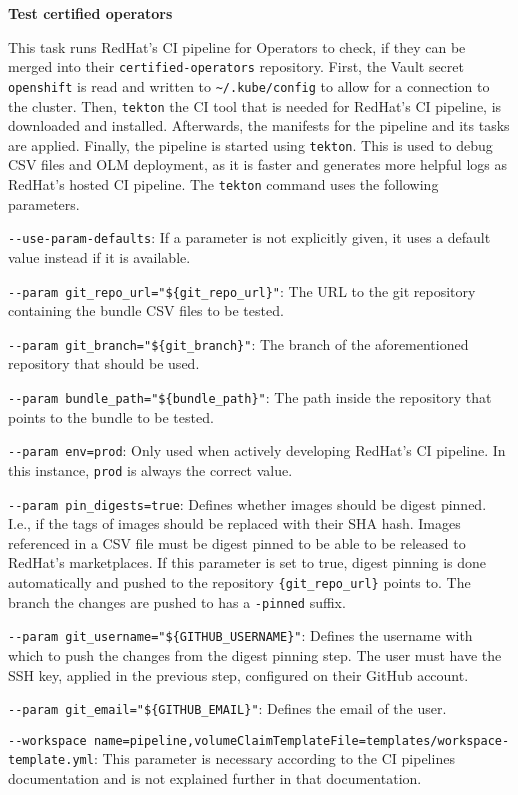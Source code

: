 \textbf{Test certified operators}

This task runs RedHat's CI pipeline for Operators to check, if they can be merged into their \verb|certified-operators| repository.
First, the Vault secret \verb|openshift| is read and written to \verb|~/.kube/config| to allow for a connection to the cluster.
Then, \verb|tekton| the CI tool that is needed for RedHat's CI pipeline, is downloaded and installed.
Afterwards, the manifests for the pipeline and its tasks are applied.
Finally, the pipeline is started using \verb|tekton|.
This is used to debug CSV files and OLM deployment, as it is faster and generates more helpful logs as RedHat's hosted CI pipeline.
The \verb|tekton| command uses the following parameters.

\verb|--use-param-defaults|: If a parameter is not explicitly given, it uses a default value instead if it is available.

\verb|--param git_repo_url="${git_repo_url}"|: The URL to the git repository containing the bundle CSV files to be tested.

\verb|--param git_branch="${git_branch}"|: The branch of the aforementioned repository that should be used.

\verb|--param bundle_path="${bundle_path}"|: The path inside the repository that points to the bundle to be tested.

\verb|--param env=prod|: Only used when actively developing RedHat's CI pipeline.
    In this instance, \verb|prod| is always the correct value.

\verb|--param pin_digests=true|: Defines whether images should be digest pinned.
    I.e., if the tags of images should be replaced with their SHA hash.
    Images referenced in a CSV file must be digest pinned to be able to be released to RedHat's marketplaces.
    If this parameter is set to true, digest pinning is done automatically and pushed to the repository \verb|{git_repo_url}| points to.
    The branch the changes are pushed to has a \verb|-pinned| suffix.

\verb|--param git_username="${GITHUB_USERNAME}"|: Defines the username with which to push the changes from the digest pinning step.
    The user must have the SSH key, applied in the previous step, configured on their GitHub account.

\verb|--param git_email="${GITHUB_EMAIL}"|: Defines the email of the user.

\verb|--workspace name=pipeline,volumeClaimTemplateFile=templates/workspace-template.yml|: This parameter is necessary according to the CI pipelines documentation and is not explained further in that documentation.

